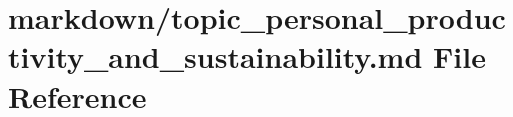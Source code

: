 \hypertarget{topic__personal__productivity__and__sustainability_8md}{}\section{markdown/topic\+\_\+personal\+\_\+productivity\+\_\+and\+\_\+sustainability.md File Reference}
\label{topic__personal__productivity__and__sustainability_8md}
